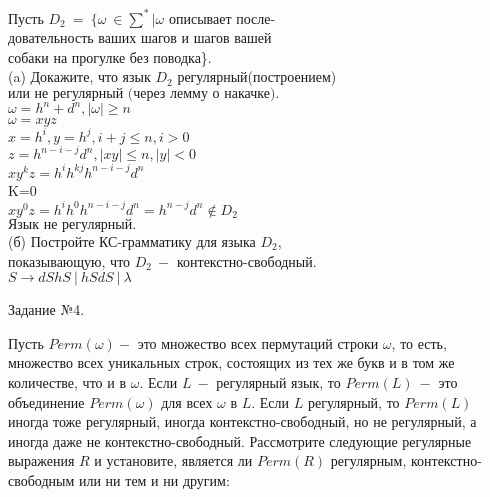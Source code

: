 \documentclass{article}
\begin{document}
\begin{enumerate}
		Пусть \(D_2\ =\ \{\omega \ \in \sum^*|\omega\)  описывает после- \\
		довательность ваших шагов и шагов вашей \\
		собаки на прогулке без поводка\}.\\	
		
		\hspace*{-20mm}(a) Докажите, что язык \(D_2\) регулярный(построением) 
		\hspace*{-20mm}\(\text{или не регулярный (через лемму о накачке).}\)\\
		
		\(\omega = h^n + d^n, |\omega|\geq n\)\\
		 \(\omega = xyz\)\\
		 \(x = h^i, y=h^j, i+j\leq n, i>0\)\\
		 \(z = h^{n-i-j}d^n , |xy|\leq n, |y|<0\)\\
		 \(xy^kz=h^ih^{kj}h^{n-i-j}d^n\)\\
		 K=0\\
		 \(xy^0z=h^ih^{0}h^{n-i-j}d^n=h^{n-j}d^n \notin D_2\)\\ 
		 \(\text{Язык не регулярный.}\)\\
            
		\hspace*{-20mm}(б) \(\text{Постройте КС-грамматику для языка } D_2\), \\
		\hspace*{-20mm} показывающую, что \(D_2\ -\) контекстно-свободный.\\
		
		\(S\rightarrow dShS\ | \ hSdS \ | \ \lambda \)\\
        \end{enumerate}
    
    \huge{\centerline{Задание №4.}}
    
    \LARGE
    Пусть \(Perm(\omega) -\) это множество всех пермутаций строки \(\omega\), то есть, множество всех уникальных строк,
    состоящих из тех же букв и в том же количестве, что и в \(\omega\). Если \(L\ -\) регулярный язык, то \(Perm(L)\ -\)
    это объединение \(Perm(\omega)\) для всех \(\omega\) в \(L\). Если \(L\) регулярный, то \(Perm(L)\) иногда тоже
    регулярный, иногда контекстно-свободный, но не регулярный, а иногда даже не контекстно-свободный.  Рассмотрите
    следующие регулярные выражения \(R\) и установите, является ли \(Perm(R)\) регулярным, контекстно-свободным или ни
    тем и ни другим:\\
    
\end{document}
